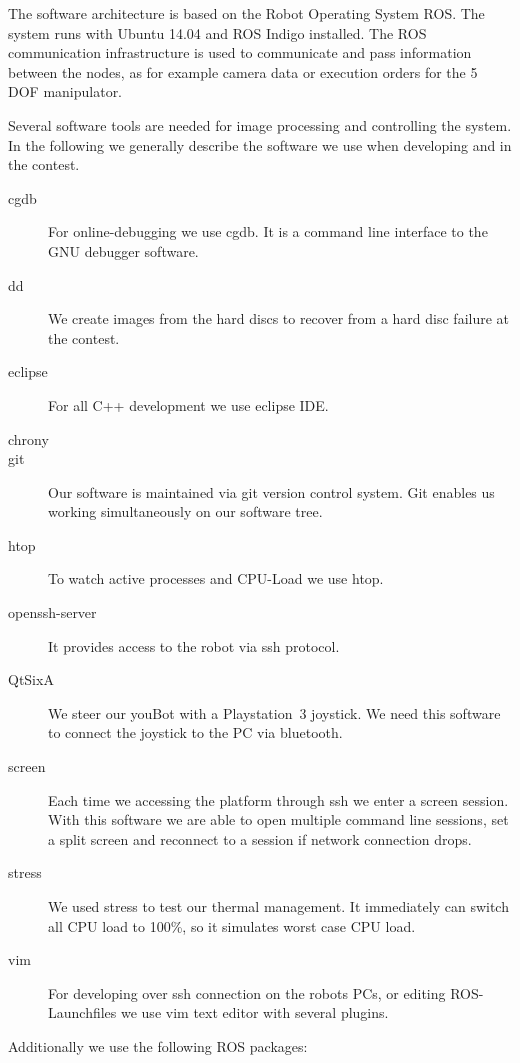 The software architecture is based on the Robot Operating System ROS. The system runs with Ubuntu 14.04 and ROS Indigo installed. The ROS communication infrastructure is used to communicate and pass information between the nodes, as for example camera data or execution orders for the 5 DOF manipulator. 

Several software tools are needed for image processing and controlling the system. In the following we generally describe the software we use when developing and in the contest.

\begin{description}
	\item [cgdb] For online-debugging we use cgdb. It is a command line interface to the GNU debugger software. 
	\item [dd] We create images from the hard discs to recover from a hard disc failure at the contest.
	\item [eclipse] For all C++ development we use eclipse IDE. 
	\item [chrony] 
	\item [git] Our software is maintained via git version  control system. Git enables us working simultaneously on our software tree.  
	\item [htop] To watch active processes and CPU-Load we use htop. 
	\item [openssh-server] It provides access to the robot via ssh protocol. 
	\item [QtSixA] We steer our youBot with a Playstation~3 joystick. We need this software to connect the joystick to the PC via bluetooth.
	\item  [screen] Each time we accessing the platform through ssh we enter a screen session. With this software we are able to open multiple command line sessions, set a split screen and reconnect to a session if network connection drops. 
	\item [stress] We used stress to test our thermal management. It immediately can switch all CPU load to 100\%, so it simulates worst case CPU load. 
	\item [vim] For developing over ssh connection on the robots PCs, or editing ROS-Launchfiles we use vim text editor with several plugins.
\end{description}

\noindent Additionally we use the following ROS packages:

